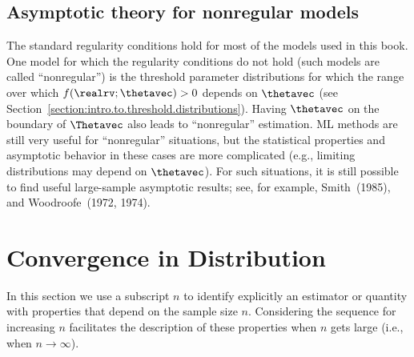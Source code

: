 \subsection{Asymptotic theory for nonregular models}
The standard regularity conditions hold for most of the models used in
this book.  One model for which the regularity conditions do not hold
(such models are called ``nonregular'') is the threshold parameter
distributions for which the range over which $f(\realrv;\thetavec) > 0
$ depends on $\thetavec$ (see
Section~\ref{section:intro.to.threshold.distributions}). Having
$\thetavec$ on the boundary of $\Thetavec$ also leads to
``nonregular'' estimation. ML methods are still very useful for
``nonregular'' situations, but the statistical properties and
asymptotic behavior in these cases are more complicated (e.g.,
limiting distributions may depend on $\thetavec$). For such
situations, it is still possible to find useful large-sample
asymptotic results; see, for example, Smith~(1985), and
Woodroofe~(1972, 1974).

\section{Convergence in Distribution}
\label{asection:convergence.in.distribution}

In this section we use a subscript $n$ to identify
explicitly 
an estimator or quantity with properties that depend on the sample
size $n$. Considering the sequence for increasing
$n$ facilitates the description
of these properties when $n$ gets large (i.e., when
$n\to \infty$).

